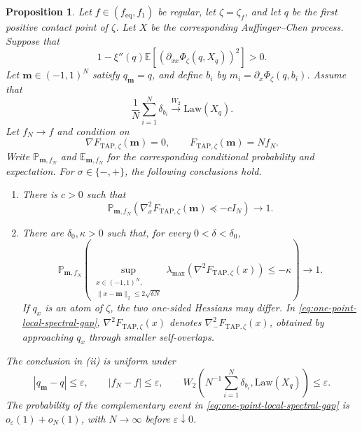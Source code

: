 \documentclass[10pt,a4paper]{amsart}
\newtheorem{proposition}{Proposition}
\newcommand{\Law}{\mathrm{Law}}
\newcommand{\TAP}{\mathrm{TAP}}
\newcommand{\bfm}{\mathbf{m}}
\newcommand{\dE}{\mathbb{E}}%
\newcommand{\dP}{\mathbb{P}}%
\newcommand{\eq}{\mathrm{eq}}
\newcommand{\ve}{\varepsilon}
\begin{document}
	\begin{proposition}\label{prop:one-point-conditional-hessian}
		Let \(f\in(f_{\eq},f_1)\) be regular, let \(\zeta=\zeta_f\), and let
		\(q\) be the first positive contact point of \(\zeta\). Let \(X\) be the
		corresponding Auffinger--Chen process. Suppose that
		\[
		1-\xi''(q)\dE\left[
		\left(
		\partial_{xx}\Phi_\zeta(q,X_q)
		\right)^2
		\right]>0.
		\]
		Let \(\bfm\in (-1,1)^N\) satisfy \(q_\bfm=q\), and define \(b_i\) by
		\(m_i=\partial_x\Phi_\zeta(q,b_i)\). Assume that
		\[
		\frac1N\sum_{i=1}^N\delta_{b_i}
		\xrightarrow{W_2}\Law(X_q).
		\]
		Let \(f_N\to f\) and condition on
		\[
		\nabla F_{\TAP,\zeta}(\bfm)=0,
		\qquad
		F_{\TAP,\zeta}(\bfm)=Nf_N.
		\]
		Write \(\dP_{\bfm,f_N}\) and \(\dE_{\bfm,f_N}\) for the corresponding
		conditional probability and expectation. For
		\(\sigma\in\{-,+\}\), the following conclusions hold.
		\begin{enumerate}[label=\textup{(\roman*)}]
			\item There is \(c>0\) such that
			\begin{equation}
				\dP_{\bfm,f_N}\left(
				\nabla_\sigma^2F_{\TAP,\zeta}(\bfm)\preceq-cI_N
				\right)\longrightarrow1.
			\end{equation}
			
			\item
			\begingroup
			There are \(\delta_0,\kappa>0\) such that, for every
			\(0<\delta<\delta_0\),
			\begin{equation}\label{eq:one-point-local-spectral-gap}
				\dP_{\bfm,f_N}\left(
				\sup_{\substack{
						x\in(-1,1)^N,\\
						\|x-\bfm\|_2\le2\sqrt{\delta N}
				}}
				\lambda_{\max}\!\left(
				\nabla^2F_{\TAP,\zeta}(x)
				\right)
				\le-\kappa
				\right)\longrightarrow1.
			\end{equation}
			If \(q_x\) is an atom of \(\zeta\), the two one-sided Hessians may
			differ. In \eqref{eq:one-point-local-spectral-gap},
			\(\nabla^2F_{\TAP,\zeta}(x)\) denotes
			\(\nabla_-^2F_{\TAP,\zeta}(x)\), obtained by approaching \(q_x\)
			through smaller self-overlaps.
			\endgroup
		\end{enumerate}
		The conclusion in \textup{(ii)} is uniform under
		\[
		|q_\bfm-q|\le\ve,
		\qquad
		|f_N-f|\le\ve,
		\qquad
		W_2\left(N^{-1}\sum_{i=1}^N\delta_{b_i},\Law(X_q)\right)\le\ve.
		\]
		The probability of the complementary event in
		\eqref{eq:one-point-local-spectral-gap} is
		\(o_\ve(1)+o_N(1)\), with \(N\to\infty\) before \(\ve\downarrow0\).
	\end{proposition}
\end{document}
